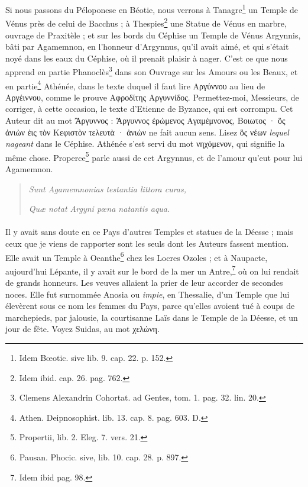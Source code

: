 \documentclass[a4paper, 18pt, oneside]{article}
\begin{document}
Si nous passons du Péloponese en Béotie, nous verrons à Tanagre\footnote{Idem Bœotic. sive lib. 9. cap. 22. p. 152.} un Temple de Vénus près de celui de Bacchus ; à Thespies\footnote{Idem ibid. cap. 26. pag. 762.} une Statue de Vénus en marbre, ouvrage de Praxitèle ; et sur les bords du Céphise un Temple de Vénus Argynnis, bâti par Agamemnon, en l'honneur d'Argynnus, qu'il avait aimé, et qui s'était noyé dans les eaux du Céphise, où il prenait plaisir à nager. C'est ce que nous apprend en partie Phanoclès\footnote{Clemens Alexandrin Cohortat. ad Gentes, tom. 1. pag. 32. lin. 20.} dans son Ouvrage sur les Amours ou les Beaux, et en partie\footnote{Athen. Deipnosophist. lib. 13. cap. 8. pag. 603. D.} Athénée, dans le texte duquel il faut lire Αργύννου au lieu de Αργέιννου, comme le prouve Αφροδίτης Αργυννίδος. Permettez-moi, Messieurs, de corriger, à cette occasion, le texte d'Etienne de Byzance, qui est corrompu. Cet Auteur dit au mot Ἄργυννος : Ἄργυννος ἐρώμενος Αγαμέμνονος, Βοιωτος · ὃς ἀνιὼν ἐις τὸν Κεφιστὸν τελευτὰ · ἀνιὼν ne fait aucun sens. Lisez ὃς νέων \emph{lequel nageant} dans le Céphise. Athénée s'est servi du mot νηχόμενον, qui signifie la même chose. Properce\footnote{Propertii, lib. 2. Eleg. 7. vers. 21.} parle aussi de cet Argynnus, et de l'amour qu'eut pour lui Agamemnon.
\begin{quotation}
\emph{Sunt Agamemnonias testantia littora curas,}

\hspace*{5mm}\emph{Quæ notat Argyni pœna natantis aqua.}
\end{quotation}
\paragraph{}
Il y avait sans doute en ce Pays d'autres Temples et statues de la Déesse ; mais ceux que je viens de rapporter sont les seuls dont les Auteurs fassent mention. Elle avait un Temple à Oeanthe\footnote{Pausan. Phocic. sive, lib. 10. cap. 28. p. 897.} chez les Locres Ozoles ; et à Naupacte, aujourd'hui Lépante, il y avait sur le bord de la mer un Antre,\footnote{Idem ibid pag. 98.} où on lui rendait de grands honneurs. Les veuves allaient la prier de leur accorder de secondes noces. Elle fut surnommée Anosia ou \emph{impie}, en Thessalie, d'un Temple que lui élevèrent sous ce nom les femmes du Pays, parce qu'elles avoient tué à coups de marchepieds, par jalousie, la courtisanne Laïs dans le Temple de la Déesse, et un jour de fête. Voyez Suidas, au mot χελώνη.
\end{document}
